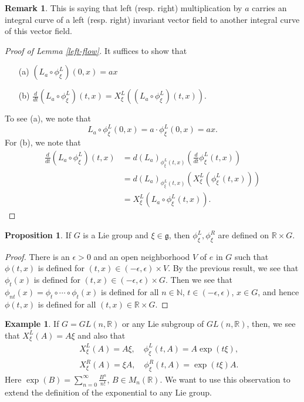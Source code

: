 \documentclass{amsart}
\numberwithin{equation}{section}
\newcommand{\bR}{\mathbb{R}}
\theoremstyle{definition}
\newtheorem{example}[definition]{Example}
\newtheorem{remark}[definition]{Remark}
\theoremstyle{theorem}
\newtheorem{proposition}[definition]{Proposition}
\begin{document}
\begin{remark}
This is saying that left (resp. right) multiplication by $a$ carries an integral curve 
of a left (resp. right) invariant vector field to another integral curve of this vector field.  
\end{remark}

\begin{proof}[Proof of Lemma \ref{left-flow}]
It suffices to show that 
\begin{enumerate}
\item[(a)] $(L_a \circ \phi_\xi^L)(0,x) = ax$  
\item[(b)] $\frac{d}{dt}(L_a \circ \phi_\xi^L)(t, x) = X_\xi^L((L_a \circ \phi_\xi^L)(t,x))$.
\end{enumerate}
To see (a), we note that 
\[
L_a \circ \phi_\xi^L(0,x) = a \cdot \phi_\xi^L(0,x) = ax.
\]
For (b), we note that 
\begin{align*}
\frac{d}{dt}(L_a \circ \phi_\xi^L)(t, x) &= d(L_a)_{\phi_\xi^{L}(t,x)}(\frac{d}{dt}\phi_\xi^L(t,x))  \\
&= d(L_a)_{\phi_\xi^{L}(t,x)} (X_\xi^L(\phi_\xi^L(t,x))) \\
&= X_\xi^L(L_a \circ \phi_\xi^L(t,x)).
\end{align*}
\end{proof}

\begin{proposition}
If $G$ is a Lie group and $\xi \in \mathfrak{g}$, then $\phi_\xi^L, \phi_\xi^R$ are defined on $\mathbb{R} \times G$. 
\end{proposition}

\begin{proof}
There is an $\epsilon > 0$ and an open neighborhood $V$ of $e$ in $G$ such that $\phi(t,x)$ is defined for $(t,x) \in (-\epsilon, \epsilon) \times V$. By the previous result, we see that $\phi_t(x)$ is defined for $(t,x) \in (-\epsilon, \epsilon) \times G$. Then we see that $\phi_{nt}(x) = \phi_t \circ \cdots \circ \phi_t(x)$ is defined for all $n \in \mathbb{N}$, $t\in (-\epsilon,\epsilon)$, $x\in G$,  and hence $\phi(t,x)$ is defined for all $(t,x)\in \bR\times G$.  
\end{proof}

\begin{example}
If $G=GL(n,\bR)$ or any Lie subgroup of $GL(n,\bR)$, then, we see that $X_\xi^L(A) = A\xi$ and also that 
\begin{eqnarray*}
&&  X_\xi^L(A)=A\xi, \quad \phi_\xi^L(t,A) = A \exp(t\xi),\\
&& X_\xi^R(A)=\xi A,\quad \phi_\xi^R(t,A) = \exp(t \xi)A. 
\end{eqnarray*}
Here $\exp(B)=\sum_{n=0}^\infty \frac{B^n}{n!}$, $B\in M_n(\bR)$. 
We want to use this observation to extend the definition of the exponential to any Lie group. 
\end{example}
\end{document}
